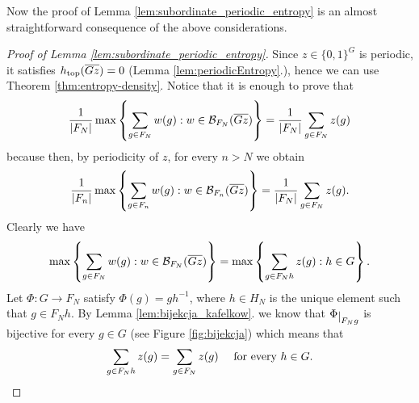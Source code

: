 \noindent
Now the proof of Lemma \ref{lem:subordinate_periodic_entropy} is an almost straightforward consequence of the above considerations.

\begin{proof}[Proof of Lemma \ref{lem:subordinate_periodic_entropy}]
Since $z\in\{0,1\}^G$ is periodic, it satisfies $h_\mathrm{top}(\overline{Gz})=0$ (Lemma \ref{lem:periodicEntropy}.), hence we can use Theorem \ref{thm:entropy-density}. Notice that it is enough to prove that 
\[
\frac{1}{|F_N|}\max\left\{\sum_{g\in F_N}w(g): w\in \mathcal B_{F_N}(\overline{Gz})\right\} = \frac{1}{|F_N|}\sum_{g\in F_N} z(g) 
\]
because then, by periodicity of $z$, for every $n>N$ we obtain
\[
\frac{1}{|F_n|}\max\left\{\sum_{g\in F_n}w(g): w\in \mathcal B_{F_n}(\overline{Gz})\right\} = \frac{1}{|F_N|}\sum_{g\in F_N} z(g) .
\]
Clearly we have
\[
\max\left\{\sum_{g\in F_N}w(g): w\in \mathcal B_{F_N}(\overline{Gz})\right\} = \max\left\{\sum_{g\in F_Nh}z(g): h\in G\right\}.
\]
Let $\Phi\colon G\to F_N$ satisfy $\Phi(g) = gh^{-1}$, where $h\in H_N$ is the unique element such that $g\in F_Nh$. 
By Lemma \ref{lem:bijekcja_kafelkow}. we know that $\Phi\restrict{F_Ng}$  is bijective for every $g\in G$ (see Figure \ref{fig:bijekcja}) which means that 
\[
\sum_{g\in F_Nh}z(g) =\sum_{g\in F_N} z(g) \quad \text{ for every } h\in G. \qedhere
\]

\end{proof}

